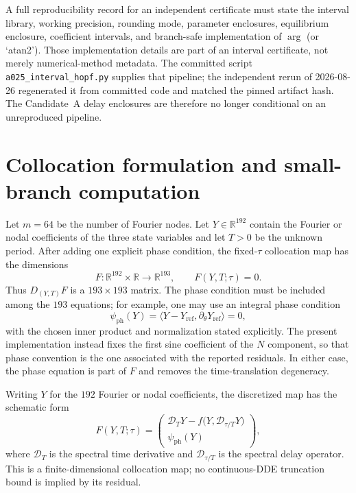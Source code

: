\documentclass[11pt]{article}
\theoremstyle{definition}
\begin{document}
A full reproducibility record for an independent certificate must state the interval library, working precision, rounding mode, parameter enclosures, equilibrium enclosure, coefficient intervals, and branch-safe implementation of $\arg$ (or `atan2'). Those implementation details are part of an interval certificate, not merely numerical-method metadata. The committed script \texttt{a025\_interval\_hopf.py} supplies that pipeline; the independent rerun of 2026-08-26 regenerated it from committed code and matched the pinned artifact hash. The Candidate~A delay enclosures are therefore no longer conditional on an unreproduced pipeline.

\section{Collocation formulation and small-branch computation}

Let $m=64$ be the number of Fourier nodes. Let $Y\in\mathbb R^{192}$ contain the Fourier or nodal coefficients of the three state variables and let $T>0$ be the unknown period. After adding one explicit phase condition, the fixed-$\tau$ collocation map has the dimensions
\begin{equation}
F:\mathbb R^{192}\times\mathbb R\longrightarrow\mathbb R^{193},
\qquad F(Y,T;\tau)=0.
\label{eq:collocation-map}
\end{equation}
Thus $D_{(Y,T)}F$ is a $193\times193$ matrix. The phase condition must be included among the $193$ equations; for example, one may use an integral phase condition
\[
\psi_{\mathrm{ph}}(Y)=
\langle Y-Y_{\mathrm{ref}},\partial_\theta Y_{\mathrm{ref}}\rangle=0,
\]
with the chosen inner product and normalization stated explicitly. The present implementation instead fixes the first sine coefficient of the $N$ component, so that phase convention is the one associated with the reported residuals. In either case, the phase equation is part of $F$ and removes the time-translation degeneracy.

Writing $Y$ for the $192$ Fourier or nodal coefficients, the discretized map has the schematic form
\[
F(Y,T;\tau)=
\begin{pmatrix}
\mathcal D_TY-f\bigl(Y,\mathcal D_{\tau/T}Y\bigr)\\
\psi_{\mathrm{ph}}(Y)
\end{pmatrix},
\]
where $\mathcal D_T$ is the spectral time derivative and $\mathcal D_{\tau/T}$ is the spectral delay operator. This is a finite-dimensional collocation map; no continuous-DDE truncation bound is implied by its residual.
\end{document}
